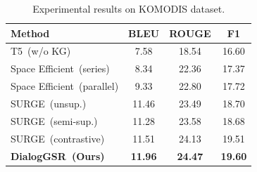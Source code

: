 \begin{table}
\centering
    \small
    \begin{tabular}{l|c|c|c}
        \toprule
        {Method} &  BLEU & ROUGE & F1\\
         \midrule 
         \midrule
         T5~(w/o KG) & 7.58 & 18.54 & 16.60\\
         Space Efficient~(series) & 8.34 & 22.36 & 17.37\\
         Space Efficient~(parallel) & 9.33 & 22.80 & 17.72\\
         SURGE~(unsup.) & 11.46 & 23.49 & 18.70\\
         SURGE~(semi-sup.) & 11.28 & 23.58 & 18.68\\
         SURGE~(contrastive)  & 11.51 & 24.13 & 19.51\\
         \midrule
         \textbf{DialogGSR~(Ours)} & \textbf{11.96} & \textbf{24.47} &\textbf{19.60}\\
        \bottomrule
    \end{tabular}
    \vspace{-5pt}
    \caption{Experimental results on KOMODIS dataset.
}
\label{tab:komodis}
\end{table}